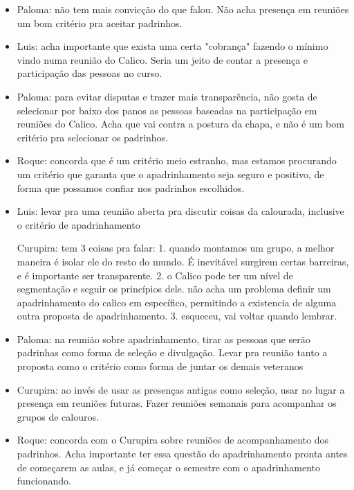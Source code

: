 \documentclass{ata-calico}
\begin{document}
\begin{itemize}
\item Paloma: não tem mais convicção do que falou. Não acha presença em reuniões um bom critério pra aceitar padrinhos.

\item Luis: acha importante que exista uma certa "cobrança" fazendo o mínimo vindo numa reunião do Calico. Seria um jeito de contar a presença e participação das pessoas no curso.

\item Paloma: para evitar disputas e trazer mais transparência, não gosta de selecionar por baixo dos panos as pessoas baseadas na participação em reuniões do Calico. Acha que vai contra a postura da chapa, e
não é um bom critério pra selecionar os padrinhos.

\item Roque: concorda que é um critério meio estranho, mas estamos procurando um critério que garanta que o apadrinhamento seja seguro e positivo, de forma que possamos confiar nos padrinhos escolhidos.

\item Luis: levar pra uma reunião aberta pra discutir coisas da calourada, inclusive o critério de apadrinhamento

Curupira: tem 3 coisas pra falar:
1. quando montamos um grupo, a melhor maneira é isolar ele do resto do mundo. É inevitável surgirem certas barreiras, e é importante ser transparente.
2. o Calico pode ter um nível de segmentação e seguir os princípios dele. não acha um problema definir um apadrinhamento do calico em específico, permitindo a existencia de alguma outra proposta de apadrinhamento.
3. esqueceu, vai voltar quando lembrar.

\item Paloma: na reunião sobre apadrinhamento, tirar as pessoas que serão padrinhas como forma de seleção e divulgação. Levar pra reunião tanto a proposta como o critério como forma de juntar os demais veteranos 

\item Curupira: ao invés de usar as presenças antigas como seleção, usar no lugar a presença em reuniões futuras. Fazer reuniões semanais para acompanhar os grupos de calouros.

\item Roque: concorda com o Curupira sobre reuniões de acompanhamento dos padrinhos. Acha importante ter essa questão do apadrinhamento pronta antes de começarem as aulas, e já começar o semestre com o apadrinhamento funcionando.


\end{itemize}
\end{document}
